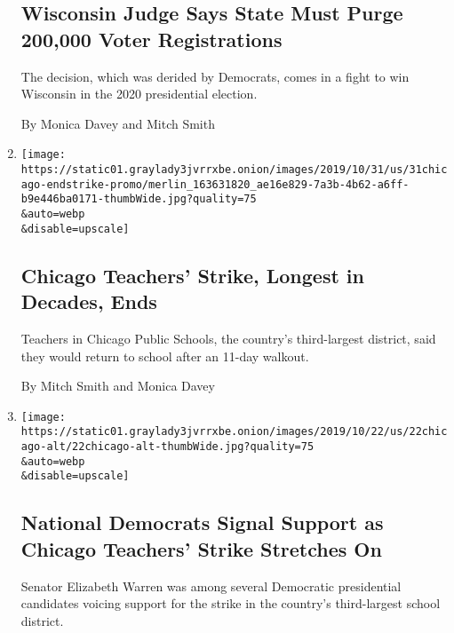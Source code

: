 \begin{enumerate}
  \hypertarget{wisconsin-judge-says-state-must-purge-200000-voter-registrations}{%
  \subsection{Wisconsin Judge Says State Must Purge 200,000 Voter
  Registrations}\label{wisconsin-judge-says-state-must-purge-200000-voter-registrations}}

  The decision, which was derided by Democrats, comes in a fight to win
  Wisconsin in the 2020 presidential election.

  By Monica Davey and Mitch Smith
\item
  \href{/2019/10/31/us/chicago-cps-teachers-strike.html}{}

  \texttt{[image: https://static01.graylady3jvrrxbe.onion/images/2019/10/31/us/31chicago-endstrike-promo/merlin\_163631820\_ae16e829-7a3b-4b62-a6ff-b9e446ba0171-thumbWide.jpg?quality=75\\\&auto=webp\\\&disable=upscale]}

  \hypertarget{chicago-teachers-strike-longest-in-decades-ends}{%
  \subsection{Chicago Teachers' Strike, Longest in Decades,
  Ends}\label{chicago-teachers-strike-longest-in-decades-ends}}

  Teachers in Chicago Public Schools, the country's third-largest
  district, said they would return to school after an 11-day walkout.

  By Mitch Smith and Monica Davey
\item
  \href{/2019/10/22/us/elizabeth-warren-chicago-teachers-strike.html}{}

  \texttt{[image: https://static01.graylady3jvrrxbe.onion/images/2019/10/22/us/22chicago-alt/22chicago-alt-thumbWide.jpg?quality=75\\\&auto=webp\\\&disable=upscale]}

  \hypertarget{national-democrats-signal-support-as-chicago-teachers-strike-stretches-on}{%
  \subsection{National Democrats Signal Support as Chicago Teachers'
  Strike Stretches
  On}\label{national-democrats-signal-support-as-chicago-teachers-strike-stretches-on}}

  Senator Elizabeth Warren was among several Democratic presidential
  candidates voicing support for the strike in the country's
  third-largest school district.


\end{enumerate}
